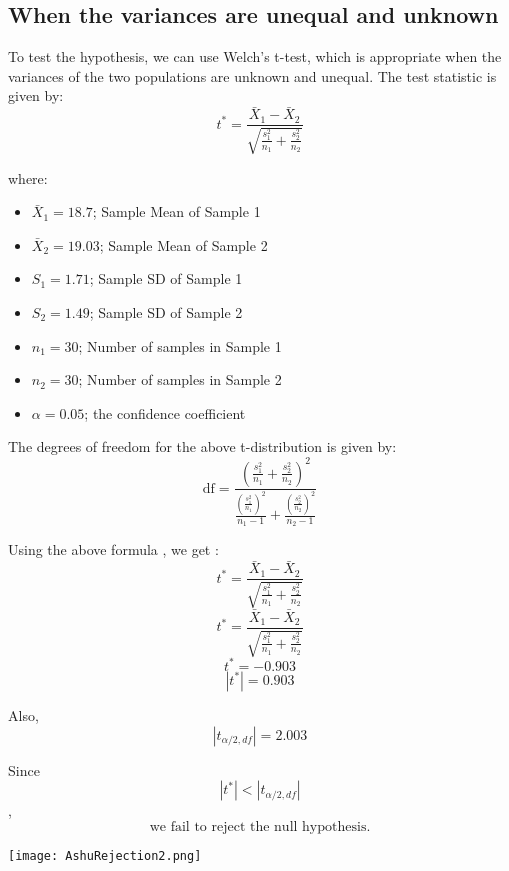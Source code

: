 \documentclass[oneside]{book}
\begin{document}
\subsection{When the variances are unequal and unknown}
To test the hypothesis, we can use Welch's t-test, which is appropriate when the variances of the two populations are unknown and unequal. The test statistic is given by:
\[ t^* = \frac{\bar{X}_1 - \bar{X}_2}{\sqrt{\frac{s_1^2}{n_1} + \frac{s_2^2}{n_2}}} \]


where:
\begin{itemize}
    \item $\bar{X}_1 = 18.7$; Sample Mean of Sample 1
    \item $\bar{X}_2 = 19.03$; Sample Mean of Sample 2
    \item $S_1 = 1.71$; Sample SD of Sample 1
    \item $S_2 = 1.49$; Sample SD of Sample 2
    \item $n_1 = 30$; Number of samples in Sample 1 
    \item $n_2 = 30$; Number of samples in Sample 2
    \item $\alpha = 0.05$; the confidence coefficient
\end{itemize}

The degrees of freedom for the above t-distribution is given by:
\Large \[ \text{df} = \frac{\left(\frac{s_1^2}{n_1} + \frac{s_2^2}{n_2}\right)^2}{\frac{\left(\frac{s_1^2}{n_1}\right)^2}{n_1 - 1} + \frac{\left(\frac{s_2^2}{n_2}\right)^2}{n_2 - 1}} \]

\large Using the above formula , we get :
\[ t^* = \frac{\bar{X}_1 - \bar{X}_2}{\sqrt{\frac{s_1^2}{n_1} + \frac{s_2^2}{n_2}}} \]
\[ t^* = \frac{\bar{X}_1 - \bar{X}_2}{\sqrt{\frac{s_1^2}{n_1} + \frac{s_2^2}{n_2}}} \]
\[ t^* = -0.903\]
\[ |t^*| = 0.903\]

Also,
\[|t_{\alpha/2, df}| = 2.003\] 

Since 
\[ |t^*| < |t_{\alpha/2, df}|\],
\[\text{we fail to reject the null hypothesis.}\]

\begin{minipage}{\textwidth}
    \centering
    \texttt{[image: AshuRejection2.png]}
    \label{fig:enter-label}
\end{minipage}
\end{document}
